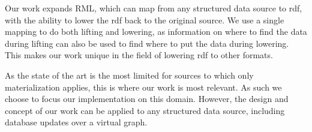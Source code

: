 Our work expands RML, which can map from any structured data source to \acrshort{rdf}, with the ability to lower the \acrshort{rdf} back to the original source. We use a single mapping to do both lifting and lowering, as information on where to find the data during lifting can also be used to find where to put the data during lowering. This makes our work unique in the field of lowering \acrshort{rdf} to other formats.

As the state of the art is the most limited for sources to which only materialization applies, this is where our work is most relevant. As such we choose to focus our implementation on this domain. However, the design and concept of our work can be applied to any structured data source, including database updates over a virtual graph.

